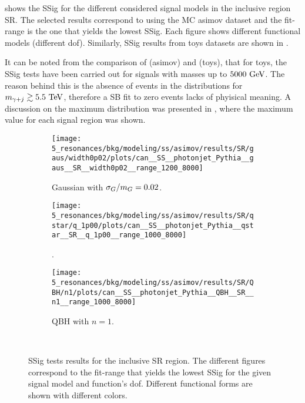 \Fig{\ref{fig:bkg_modeling:sstest_results_asimov_SR}} shows the \ac{SSig} for the different considered signal models in the inclusive region SR. The selected results correspond to using the \ac{MC} asimov dataset and the fit-range is the one that yields the lowest \ac{SSig}. Each figure shows different functional models (different \ac{dof}). Similarly, \ac{SSig} results from toys datasets are shown in \Fig{\ref{fig:bkg_modeling:sstest_results_toys_SR}}.

It can be noted from the comparison of \Fig{\ref{fig:bkg_modeling:sstest_results_asimov_SR}} (asimov) and \Fig{\ref{fig:bkg_modeling:sstest_results_toys_SR}} (toys), that for toys, the \ac{SSig} tests have been carried out for signals with masses up to \(5000~\text{GeV}\). The reason behind this is the absence of events in the \myj distributions for \(m_{\gamma+j} \gtrsim 5.5~\text{TeV}\), therefore a \ac{SB} fit to zero events lacks of phyisical meaning. A discussion on the maximum \myj distribution was presented in \Sect{\ref{subsubsec:bkg:modeling:preparation:toys}}, where the maximum \myj value for each signal region was shown.


\begin{figure}[ht!]
    \centering
    \begin{subfigure}[h]{0.32\linewidth}
        \centering
        \texttt{[image: 5\_resonances/bkg/modeling/ss/asimov/results/SR/gaus/width0p02/plots/can\_\_SS\_\_photonjet\_Pythia\_\_gaus\_\_SR\_\_width0p02\_\_range\_1200\_8000]}
        \caption{Gaussian with \(\sigma_G / m_{G} = 0.02\).}
    \end{subfigure}
    \hfill
    \begin{subfigure}[h]{0.32\linewidth}
        \centering
        \texttt{[image: 5\_resonances/bkg/modeling/ss/asimov/results/SR/qstar/q\_1p00/plots/can\_\_SS\_\_photonjet\_Pythia\_\_qstar\_\_SR\_\_q\_1p00\_\_range\_1000\_8000]}
        \caption{\qstar.}
    \end{subfigure}
    \begin{subfigure}[h]{0.32\linewidth}
        \centering
        \texttt{[image: 5\_resonances/bkg/modeling/ss/asimov/results/SR/QBH/n1/plots/can\_\_SS\_\_photonjet\_Pythia\_\_QBH\_\_SR\_\_n1\_\_range\_1000\_8000]}
        \caption{\ac{QBH} with \(n=1\).}
    \end{subfigure}\\
    \caption{\ac{SSig} tests results for the inclusive SR region. The different figures correspond to the fit-range that yields the lowest \ac{SSig} for the given signal model and function's \ac{dof}. Different functional forms are shown with different colors.}
    \label{fig:bkg_modeling:sstest_results_asimov_SR}
\end{figure}


